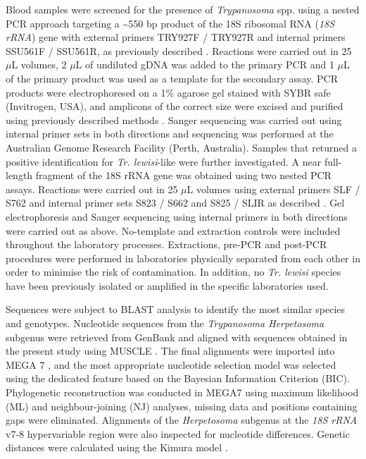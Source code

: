 \documentclass[a4paper, nobind]{templates/ociamthesis}
\begin{document}
Blood samples were screened for the presence of \emph{Trypanosoma} spp. using a nested PCR approach targeting a \textasciitilde550 bp product of the 18S ribosomal RNA (\emph{18S rRNA}) gene with external primers TRY927F / TRY927R and internal primers SSU561F / SSU561R, as previously described \autocite{noyesNestedPCRSsrRNA1999}. Reactions were carried out in 25 \(\mu\)L volumes, 2 \(\mu\)L of undiluted gDNA was added to the primary PCR and 1 \(\mu\)L of the primary product was used as a template for the secondary assay. PCR products were electrophoresed on a 1\% agarose gel stained with SYBR safe (Invitrogen, USA), and amplicons of the correct size were excised and purified using previously described methods \autocite{yangSpecificQuantitativeDetection2013}. Sanger sequencing was carried out using internal primer sets in both directions and sequencing was performed at the Australian Genome Research Facility (Perth, Australia). Samples that returned a positive identification for \emph{Tr. lewisi}-like were further investigated. A near full-length fragment of the 18S rRNA gene was obtained using two nested PCR assays. Reactions were carried out in 25 \(\mu\)L volumes using external primers SLF / S762 and internal primer sets S823 / S662 and S825 / SLIR as described \autocite{mcinnesTrypanosomaIrwiniSp2009}. Gel electrophoresis and Sanger sequencing using internal primers in both directions were carried out as above. No-template and extraction controls were included throughout the laboratory processes. Extractions, pre-PCR and post-PCR procedures were performed in laboratories physically separated from each other in order to minimise the risk of contamination. In addition, no \emph{Tr. lewisi} species have been previously isolated or amplified in the specific laboratories used.

Sequences were subject to BLAST analysis to identify the most similar species and genotypes. Nucleotide sequences from the \emph{Trypanosoma Herpetosoma} subgenus were retrieved from GenBank \autocite{bensonGenBank2017} and aligned with sequences obtained in the present study using MUSCLE \autocite{edgarMUSCLEMultipleSequence2004}. The final alignments were imported into MEGA 7 \autocite{kumarMEGA7MolecularEvolutionary2016}, and the most appropriate nucleotide selection model was selected using the dedicated feature based on the Bayesian Information Criterion (BIC). Phylogenetic reconstruction was conducted in MEGA7 using maximum likelihood (ML) and neighbour-joining (NJ) analyses, missing data and positions containing gaps were eliminated. Alignments of the \emph{Herpetosoma} subgenus at the \emph{18S rRNA} v7-8 hypervariable region were also inspected for nucleotide differences. Genetic distances were calculated using the Kimura model \autocite{edgarMUSCLEMultipleSequence2004}.
\end{document}
